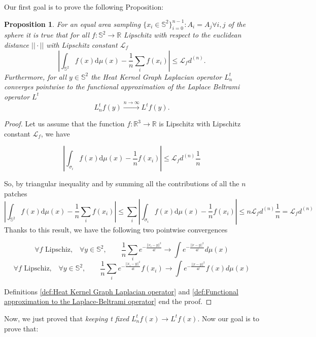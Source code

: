 \documentclass{article} %
\newtheorem{prop}{Proposition}
\begin{document}
Our first goal is to prove the following Proposition:
\vspace{0.5cm}
\begin{prop}\label{prop:1}
	For an equal area sampling $\{x_i\in\mathbb S^2\}_{i=0}^{n-1}: A_i=A_j \forall i,j$ of the sphere it is true that for all $f: \mathbb S^2 \rightarrow \mathbb R$ Lipschitz with respect to the euclidean distance $||\cdot||$ with Lipschitz constant $\mathcal L_f$
	$$
	\left| \int_{\mathbb S^2}f({ x})\text{d}{\mu(x)} - \frac{1}{n}\sum_i f( x_i)\right|\leq \mathcal L_fd^{(n)}.
	$$
	Furthermore, for all $y\in\mathbb S^2$ the Heat Kernel Graph Laplacian operator $L^t_n$ converges pointwise to the functional approximation of the Laplace Beltrami operator $L^t$
	$$ L_n^tf(y)\xrightarrow{n\to\infty} L^tf(y).$$
\end{prop}
\vspace{0.5cm}

\begin{proof}

	Let us assume that the function $f:\mathbb R^3\rightarrow \mathbb R$ is Lipschitz with Lipschitz constant $\mathcal L_f$, we have

	$$\left| \int_{\sigma_{i}}f({ x})\text{d}{\mu(x)} - \frac{1}{n}f( x_i)\right| \leq \mathcal L_fd^{(n)}\frac{1}{n} $$

	So, by triangular inequality and by summing all the contributions of all the $n$ patches
	$$\left| \int_{\mathbb S^2}f({ x})\text{d}{\mu(x)} - \frac{1}{n}\sum_i f( x_i)\right| \leq \sum_i \left| \int_{\sigma_{i}}f({ x})\text{d}{\mu(x)} - \frac{1}{n}f( x_i)\right|\leq n  \mathcal L_fd^{(n)}\frac{1}{n} = \mathcal L_fd^{(n)}$$
	Thanks to this result, we have the following two pointwise convergences

	$$\forall f \text{ Lipschiz,}\quad \forall y\in\mathbb S^2,  \quad\quad \frac{1}{n}\sum_i e^{-\frac{||x_i-y||^2}{4t}}\rightarrow \int e^{-\frac{||x-y||^2}{4t}}d\mu(x)$$
	$$\forall f \text{ Lipschiz,}\quad \forall y\in\mathbb S^2,  \quad\quad \frac{1}{n}\sum_i e^{-\frac{||x_i-y||^2}{4t}}f(x_i)\rightarrow \int e^{-\frac{||x-y||^2}{4t}}f(x)d\mu(x)$$

	Definitions \ref{def:Heat Kernel Graph Laplacian operator} and \ref{def:Functional approximation to the Laplace-Beltrami operator} end the proof.
\end{proof}
\vspace{0.5cm}

Now, we just proved that \textit{keeping t fixed} $L_n^tf(x)\rightarrow L^tf(x)$. Now our goal is to prove that:
\end{document}
